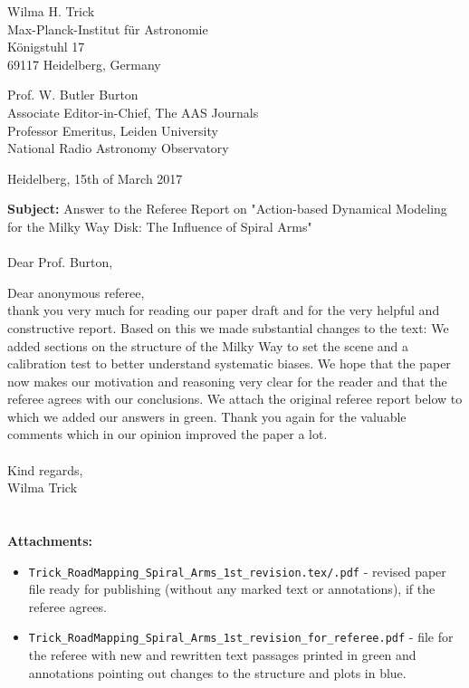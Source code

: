 \documentclass[10pt,a4paper]{article}
\begin{document}
\begin{flushright}
Wilma H. Trick\\
Max-Planck-Institut f\"{u}r Astronomie\\
K\"{o}nigstuhl 17\\
69117 Heidelberg, Germany
\end{flushright}

\noindent Prof. W. Butler Burton\\
Associate Editor-in-Chief, The AAS Journals\\
Professor Emeritus, Leiden University\\
National Radio Astronomy Observatory\\

\begin{flushright}
Heidelberg, 15th of March 2017
\end{flushright}

\textbf{Subject:} Answer to the Referee Report on "Action-based Dynamical Modeling for the Milky Way Disk: The Influence of Spiral Arms"\\\\

Dear Prof. Burton,

Dear anonymous referee,\\

thank you very much for reading our paper draft and for the very helpful and constructive report. Based on this we made substantial changes to the text: We added sections on the structure of the Milky Way to set the scene and a calibration test to better understand systematic biases. We hope that the paper now makes our motivation and reasoning very clear for the reader and that the referee agrees with our conclusions. We attach the original referee report below to which we added our answers in green. Thank you again for the valuable comments which in our opinion improved the paper a lot.\\\\
Kind regards,\\
Wilma Trick\\\\\\

\noindent\textbf{Attachments:}
\begin{itemize}
\item \texttt{Trick{\_}RoadMapping{\_}Spiral{\_}Arms{\_}1st{\_}revision.tex/.pdf} - revised paper file ready for publishing (without any marked text or annotations), if the referee agrees.
\item \texttt{Trick{\_}RoadMapping{\_}Spiral{\_}Arms{\_}1st{\_}revision{\_}for{\_}referee.pdf} - file for the referee with new and rewritten text passages printed in green and annotations pointing out changes to the structure and plots in blue.
\end{itemize}
\end{document}
